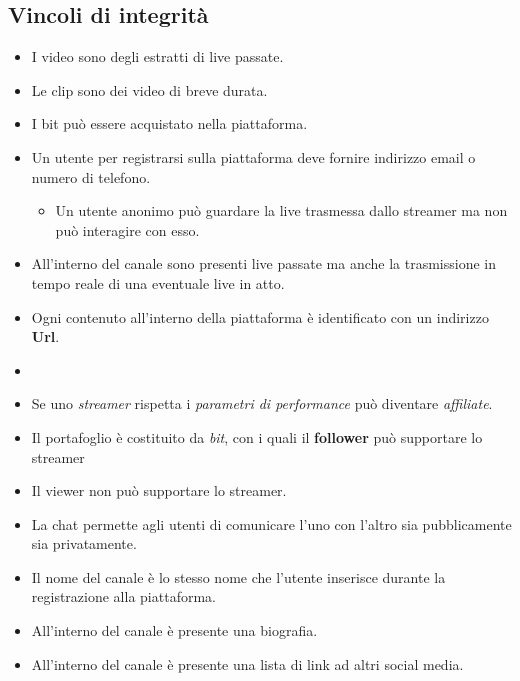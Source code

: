 \subsection{Vincoli di integrità}
\begin{itemize}
    \item I video sono degli estratti di live passate.
    \item Le clip sono dei video di breve durata.
    \item I bit può essere acquistato nella piattaforma.
    \item Un utente per registrarsi sulla piattaforma deve fornire indirizzo email o numero di telefono.
    \begin{itemize}
        \item Un utente anonimo può guardare la live trasmessa dallo streamer ma non può interagire con esso. 
    \end{itemize}
    \item All'interno del canale sono presenti live passate ma anche la trasmissione in tempo reale di una eventuale live in atto.
    \item Ogni contenuto all'interno della piattaforma è identificato con un indirizzo \textbf{Url}.
    \item 
        \item Se uno \textit{streamer} rispetta i \textit{parametri di performance} può diventare \textit{affiliate}.
        \item Il portafoglio è costituito da \textit{bit}, con i quali il \textbf{follower} può supportare lo streamer
        \item Il viewer non può supportare lo streamer.
        \item La chat permette agli utenti di comunicare l'uno con l'altro sia pubblicamente sia privatamente.
        \item Il nome del canale è lo stesso nome che l'utente inserisce durante la registrazione alla piattaforma.
        \item All'interno del canale è presente una biografia. 
        \item All'interno del canale è presente una lista di link ad altri social media.
\end{itemize}